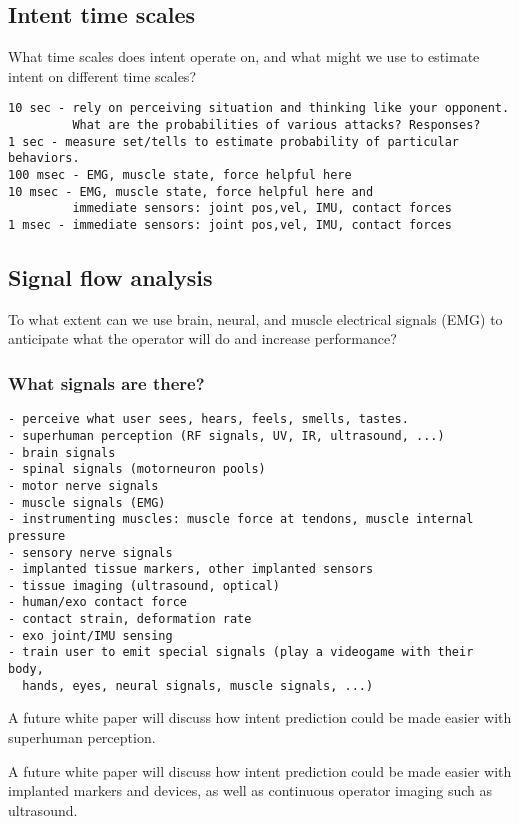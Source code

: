 \documentclass[letterpaper,12pt,fullpage]{article}
\begin{document}
\subsection{Intent time scales}

What time scales does intent operate on, and what might we use
to estimate intent on different time scales?

\begin{verbatim}
10 sec - rely on perceiving situation and thinking like your opponent.
         What are the probabilities of various attacks? Responses?
1 sec - measure set/tells to estimate probability of particular behaviors.
100 msec - EMG, muscle state, force helpful here
10 msec - EMG, muscle state, force helpful here and
         immediate sensors: joint pos,vel, IMU, contact forces
1 msec - immediate sensors: joint pos,vel, IMU, contact forces
\end{verbatim}

\subsection{Signal flow analysis}

To what extent can we use brain, neural, and muscle electrical signals
(EMG) to anticipate what the operator will do and increase performance?

\subsubsection{What signals are there?}

\begin{verbatim}
- perceive what user sees, hears, feels, smells, tastes.
- superhuman perception (RF signals, UV, IR, ultrasound, ...)
- brain signals
- spinal signals (motorneuron pools)
- motor nerve signals
- muscle signals (EMG)
- instrumenting muscles: muscle force at tendons, muscle internal pressure
- sensory nerve signals
- implanted tissue markers, other implanted sensors
- tissue imaging (ultrasound, optical)
- human/exo contact force
- contact strain, deformation rate
- exo joint/IMU sensing
- train user to emit special signals (play a videogame with their body,
  hands, eyes, neural signals, muscle signals, ...)
\end{verbatim}

A future white paper will discuss how intent prediction could be 
made easier with superhuman perception.

A future white paper will discuss how intent prediction could be 
made easier with implanted markers and devices, as well as continuous
operator imaging such as ultrasound.
\end{document}
